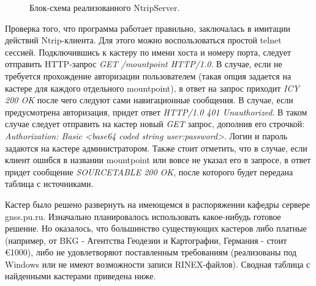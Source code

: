 \documentclass[a4paper,12pt]{report}
\begin{document}
\begin{figure}[h]
\caption{Блок-схема реализованного NtripServer.}
\label{ntrip}
\end{figure}

Проверка того, что программа работает правильно, заключалась в имитации действий Ntrip-клиента. Для этого можно воспользоваться простой telnet 
сессией. Подключившись к кастеру по имени хоста и номеру порта, следует отправить HTTP-запрос {\it GET /mountpoint HTTP/1.0}. В случае, если 
не требуется прохождение авторизации пользователем (такая опция задается на кастере для каждого отдельного mountpoint), в ответ на запрос приходит 
{\it ICY 200 OK} после чего следуют сами навигационные сообщения. В случае, если предусмотрена авторизация, придет ответ {\it HTTP/1.0 401 
Unauthorized}. В таком случае следует отправить на кастер новый {\it GET} запрос, дополнив его строчкой: {\it Authorization: Basic <base64 coded 
string user:password>}. Логин и пароль задаются на кастере администратором. Также стоит отметить, что в случае, если клиент ошибся в названии 
mountpoint или вовсе не указал его в запросе, в ответ придет сообщение {\it SOURCETABLE 200 OK}, после которого будет передана таблица с источниками.
\par Кастер было решено развернуть на имеющемся в распоряжении кафедры сервере gnss.pu.ru. Изначально планировалось использовать какое-нибудь 
готовое решение. Но оказалось, что большинство существующих кастеров либо платные (например, от BKG - Агентства Геодезии и Картографии, Германия 
- стоит \euro1000), либо не удовлетворяют поставленным требованиям (реализованы под Windows или не имеют возможности записи RINEX-файлов). 
Сводная таблица с найденными кастерами приведена ниже.
\end{document}
